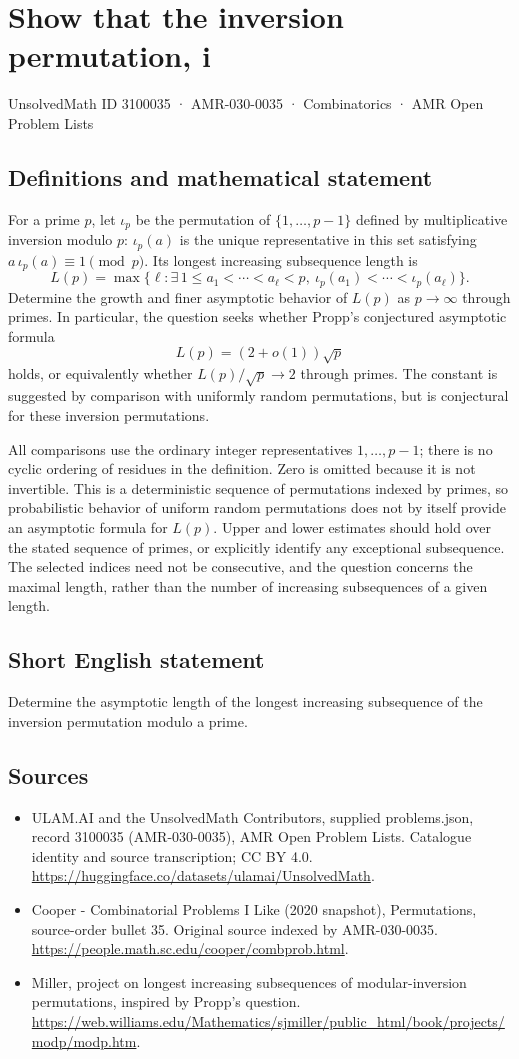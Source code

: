 \documentclass[11pt,a4paper]{article}
\begin{document}
\section*{Show that the inversion permutation, i}\label{3100035}
{\small UnsolvedMath ID 3100035 · AMR-030-0035 · Combinatorics · AMR Open Problem Lists}
\subsection{Definitions and mathematical statement}
For a prime $p$, let $\iota_p$ be the permutation of
$\{1,\ldots,p-1\}$ defined by multiplicative inversion modulo $p$:
$\iota_p(a)$ is the unique representative in this set satisfying
$a\,\iota_p(a)\equiv1\pmod p$. Its longest increasing subsequence
length is
\[
 L(p)=\max\{\ell:\exists\,1\le a_1<\cdots<a_\ell<p,
           \ \iota_p(a_1)<\cdots<\iota_p(a_\ell)\}.
\]
Determine the growth and finer asymptotic behavior of $L(p)$ as
$p\to\infty$ through primes. In particular, the question seeks
whether Propp's conjectured asymptotic formula
\[
                         L(p)=(2+o(1))\sqrt p
\]
holds, or equivalently whether $L(p)/\sqrt p\to2$ through primes.
The constant is suggested by comparison with uniformly random
permutations, but is conjectural for these inversion permutations.

All comparisons use the ordinary integer representatives
$1,\ldots,p-1$; there is no cyclic ordering of residues in the
definition. Zero is omitted because it is not invertible.
This is a deterministic sequence of permutations indexed by
primes, so probabilistic behavior of uniform random permutations
does not by itself provide an asymptotic formula for $L(p)$.
Upper and lower estimates should hold over the stated sequence of
primes, or explicitly identify any exceptional subsequence.
The selected indices need not be consecutive, and the question
concerns the maximal length, rather than the number of increasing
subsequences of a given length.
\subsection{Short English statement}
Determine the asymptotic length of the longest increasing subsequence of the inversion permutation modulo a prime.
\subsection{Sources}
\begin{itemize}
\item[S1] ULAM.AI and the UnsolvedMath Contributors, supplied problems.json, record 3100035 (AMR-030-0035), AMR Open Problem Lists. Catalogue identity and source transcription; CC BY 4.0.
\url{https://huggingface.co/datasets/ulamai/UnsolvedMath}.
\item[S2] Cooper - Combinatorial Problems I Like (2020 snapshot), Permutations, source-order bullet 35. Original source indexed by AMR-030-0035.
\url{https://people.math.sc.edu/cooper/combprob.html}.
\item[S3] Miller, project on longest increasing subsequences of modular-inversion permutations, inspired by Propp’s question.
\url{https://web.williams.edu/Mathematics/sjmiller/public_html/book/projects/modp/modp.htm}.
\end{itemize}
\end{document}

